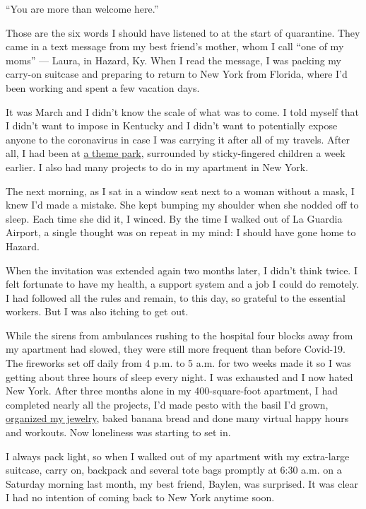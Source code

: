 ``You are more than welcome here.''

Those are the six words I should have listened to at the start of
quarantine. They came in a text message from my best friend's mother,
whom I call ``one of my moms'' --- Laura, in Hazard, Ky. When I read the
message, I was packing my carry-on suitcase and preparing to return to
New York from Florida, where I'd been working and spent a few vacation
days.

It was March and I didn't know the scale of what was to come. I told
myself that I didn't want to impose in Kentucky and I didn't want to
potentially expose anyone to the coronavirus in case I was carrying it
after all of my travels. After all, I had been at
\href{https://www.nytimes3xbfgragh.onion/2020/03/12/travel/coronavirus-disneyworld-theme-parks.html}{a
theme park}, surrounded by sticky-fingered children a week earlier. I
also had many projects to do in my apartment in New York.

The next morning, as I sat in a window seat next to a woman without a
mask, I knew I'd made a mistake. She kept bumping my shoulder when she
nodded off to sleep. Each time she did it, I winced. By the time I
walked out of La Guardia Airport, a single thought was on repeat in my
mind: I should have gone home to Hazard.

When the invitation was extended again two months later, I didn't think
twice. I felt fortunate to have my health, a support system and a job I
could do remotely. I had followed all the rules and remain, to this day,
so grateful to the essential workers. But I was also itching to get out.

While the sirens from ambulances rushing to the hospital four blocks
away from my apartment had slowed, they were still more frequent than
before Covid-19. The fireworks set off daily from 4 p.m. to 5 a.m. for
two weeks made it so I was getting about three hours of sleep every
night. I was exhausted and I now hated New York. After three months
alone in my 400-square-foot apartment, I had completed nearly all the
projects, I'd made pesto with the basil I'd grown,
\href{https://www.nytimes3xbfgragh.onion/2020/05/29/travel/the-world-in-a-jewelry-box.html}{organized
my jewelry}, baked banana bread and done many virtual happy hours and
workouts. Now loneliness was starting to set in.

I always pack light, so when I walked out of my apartment with my
extra-large suitcase, carry on, backpack and several tote bags promptly
at 6:30 a.m. on a Saturday morning last month, my best friend, Baylen,
was surprised. It was clear I had no intention of coming back to New
York anytime soon.


